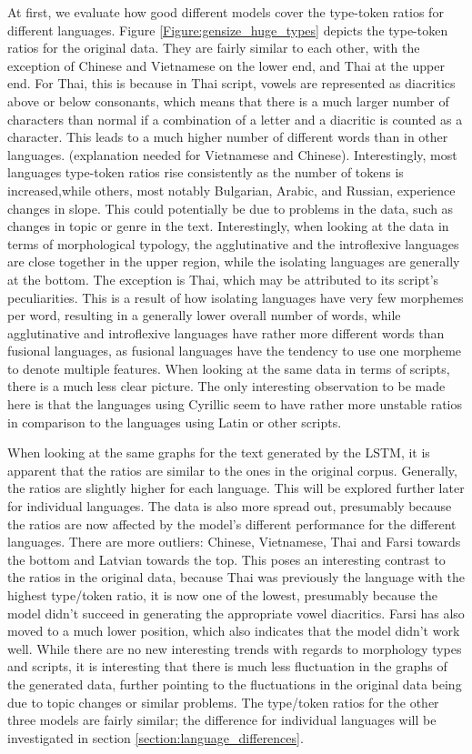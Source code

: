 \documentclass[11pt,a4paper,twoside,openright]{scrbook}
\begin{document}
At first, we evaluate how good different models cover the type-token ratios for different languages. Figure \ref{Figure:gensize_huge_types} depicts the type-token ratios for the original data. They are fairly similar to each other, with the exception of Chinese and Vietnamese on the lower end, and Thai at the upper end. For Thai, this is because in Thai script, vowels are represented as diacritics above or below consonants, which means that there is a much larger number of characters than normal if a combination of a letter and a diacritic is counted as a character. This leads to a much higher number of different words than in other languages. (explanation needed for Vietnamese and Chinese). 
Interestingly, most languages type-token ratios rise consistently as the number of tokens is increased,while others, most notably Bulgarian, Arabic, and Russian, experience changes in slope. This could potentially be due to problems in the data, such as changes in topic or genre in the text. Interestingly, when looking at the data in terms of morphological typology, the agglutinative and the introflexive languages are close together in the upper region, while the isolating languages are generally at the bottom. The exception is Thai, which may be attributed to its script’s peculiarities. This is a result of how isolating languages have very few morphemes per word, resulting in a generally lower overall number of words, while agglutinative and introflexive languages have rather more different words than fusional languages, as fusional languages have the tendency to use one morpheme to denote multiple features. When looking at the same data in terms of scripts, there is a much less clear picture. The only interesting observation to be made here is that the languages using Cyrillic seem to have rather more unstable ratios in comparison to the languages using Latin or other scripts. 

When looking at the same graphs for the text generated by the LSTM, it is apparent that the ratios are similar to the ones in the original corpus. Generally, the ratios are slightly higher for each language. This will be explored further later for individual languages. The data is also more spread out, presumably because the ratios are now affected by the model’s different performance for the different languages. There are more outliers: Chinese, Vietnamese, Thai and Farsi towards the bottom and Latvian towards the top. This poses an interesting contrast to the ratios in the original data, because Thai was previously the language with the highest type/token ratio, it is now one of the lowest, presumably because the model didn’t succeed in generating the appropriate vowel diacritics. Farsi has also moved to a much lower position, which also indicates that the model didn’t work well. While there are no new interesting trends with regards to morphology types and scripts, it is interesting that there is much less fluctuation in the graphs of the generated data, further pointing to the fluctuations in the original data being due to topic changes or similar problems. The type/token ratios for the other three models are fairly similar; the difference for individual languages will be investigated in section  \ref{section:language_differences}.
\end{document}
